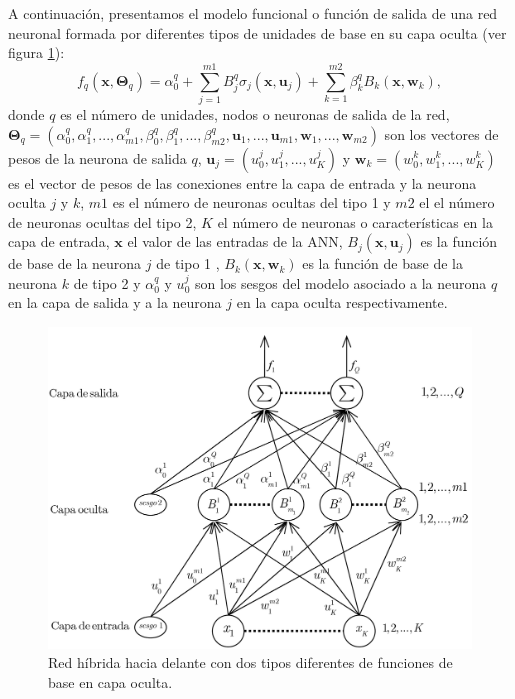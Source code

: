 A continuación, presentamos el modelo funcional o función de salida de una red
neuronal formada por diferentes tipos de unidades de base en su capa oculta (ver figura
\ref{ejemploHibrida}):
\begin{equation}\label{modelofhibrido}
f_{q}\left(\mathbf{x},\mathbf{\Theta}_{q} \right)= \alpha_{0}^q +\sum_{j=1}^{m1}
B_{j}^q \sigma_{j} \left( \mathbf{x},\mathbf{u}_{j}\right)+\sum_{k=1}^{m2}
\beta_{k}^q B_{k} \left( \mathbf{x},\mathbf{w}_{k}\right),
\end{equation}
donde $q$ es el número de unidades, nodos o neuronas de salida de la red,
$\displaystyle
\mathbf{\Theta}_{q}=\left(\alpha_{0}^q,\alpha_{1}^q,...,\alpha_{m1}^q,\beta_{0}^q,\beta_
{1}^q,...,\beta_{m2}^q,\mathbf{u}_{1},...,\mathbf{u}_{m1},
\mathbf{w}_{1},...,\mathbf{w}_{m2} \right)$ son los vectores de pesos de la neurona de
salida $q$, $\displaystyle \mathbf{u}_{j}=\left( u_{0}^j,u_{1}^j,...,u_{K}^j\right) $ y
$\displaystyle \mathbf{w}_{k}=\left( w_{0}^k,w_{1}^k,...,w_{K}^k\right) $ es el vector de
pesos de las conexiones entre la capa de entrada y la neurona oculta $j$ y $k$, $m1$ es el
número de neuronas ocultas del tipo 1 y $m2$ el el número de neuronas ocultas del tipo 2,
$K$ el número de neuronas o características en la capa de entrada,
$\mathbf{x}$ el valor de las entradas de la ANN, $\displaystyle B_{j}
\left( \mathbf{x},\mathbf{u}_{j}\right)$ es la función de base de la neurona $j$ de tipo 1
, $\displaystyle B_{k}
\left( \mathbf{x},\mathbf{w}_{k}\right)$ es la función de base de la neurona $k$ de tipo 2
y $\displaystyle \alpha_{0}^q$ y $\displaystyle u_{0}^j$ son los sesgos del modelo
asociado a la neurona $q$ en la capa de salida y a la neurona $j$ en la capa oculta
respectivamente.

\begin{figure}[htb]
\centering
\includegraphics[keepaspectratio,width=12.5cm]{figuras/redHibridaHaciaDelante.jpg}
\caption{Red híbrida hacia delante con dos tipos diferentes de funciones de base en capa
oculta.}
\label{ejemploHibrida}
\end{figure}

